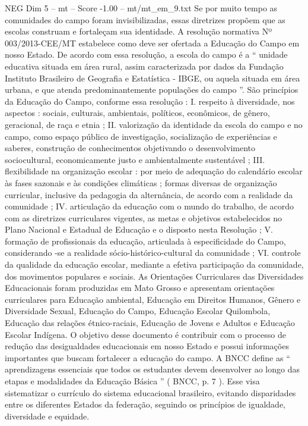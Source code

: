 \begin{textsample}{NEG Dim 5 – mt – Score -1.00 – mt/mt\_em\_9.txt}
Se por muito tempo as comunidades do campo foram invisibilizadas, essas diretrizes propõem que as escolas construam e fortaleçam sua identidade.
A resolução normativa Nº 003/2013-CEE/MT estabelece como deve ser ofertada a Educação do Campo em nosso Estado.
De acordo com essa resolução, a escola do campo é a “ unidade educativa situada em área rural, assim caracterizada por dados da Fundação Instituto Brasileiro de Geografia e Estatística - IBGE, ou aquela situada em área urbana, e que atenda predominantemente populações do campo ”.
São princípios da Educação do Campo, conforme essa resolução : I. respeito à diversidade, nos aspectos : sociais, culturais, ambientais, políticos, econômicos, de gênero, geracional, de raça e etnia ; II. valorização da identidade da escola do campo e no campo, como espaço público de investigação, socialização de experiências e saberes, construção de conhecimentos objetivando o desenvolvimento sociocultural, economicamente justo e ambientalmente sustentável ; III. flexibilidade na organização escolar : por meio de adequação do calendário escolar às fases sazonais e às condições climáticas ; formas diversas de organização curricular, inclusive da pedagogia da alternância, de acordo com a realidade da comunidade ; IV. articulação da educação com o mundo do trabalho, de acordo com as diretrizes curriculares vigentes, as metas e objetivos estabelecidos no Plano Nacional e Estadual de Educação e o disposto nesta Resolução ; V. formação de profissionais da educação, articulada à especificidade do Campo, considerando -se a realidade sócio-histórico-cultural da comunidade ; VI. controle da qualidade da educação escolar, mediante a efetiva participação da comunidade, dos movimentos populares e sociais.
As Orientações Curriculares das Diversidades Educacionais foram produzidas em Mato Grosso e apresentam orientações curriculares para Educação ambiental, Educação em Direitos Humanos, Gênero e Diversidade Sexual, Educação do Campo, Educação Escolar Quilombola, Educação das relações étnico-raciais, Educação de Jovens e Adultos e Educação Escolar Indígena.
O objetivo desse documento é contribuir com o processo de redução das desigualdades educacionais em nosso Estado e possui informações importantes que buscam fortalecer a educação do campo.
A BNCC define as “ aprendizagens essenciais que todos os estudantes devem desenvolver ao longo das etapas e modalidades da Educação Básica ” ( BNCC, p. 7 ).
Esse visa sistematizar o currículo do sistema educacional brasileiro, evitando disparidades entre os diferentes Estados da federação, seguindo os princípios de igualdade, diversidade e equidade.

\end{textsample}
